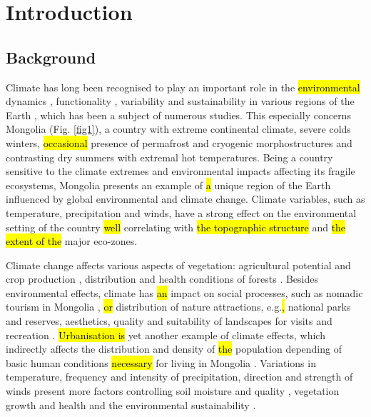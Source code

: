 \documentclass[geosciences,article,submit,pdftex,moreauthors]{Definitions/mdpi}
\begin{document}
\section{Introduction}

\subsection{Background}
Climate has long been recognised to play an important role in the \hl{environmental} dynamics \cite{Dashkhuu}, functionality \cite{Natsagdorj,An}, variability and sustainability in various regions of the Earth \cite{SATTLER2021101620,Jiang,Lemenkova2021a,DUGERDIL2021107235}, which has been a subject of numerous studies. This especially concerns Mongolia (Fig. \ref{fig1}), a country with extreme continental climate, severe colds winters, \hl{occasional} presence of permafrost and cryogenic morphostructures \cite{Dashtseren2021,Tsedevdorj2021,Blomdin} and contrasting dry summers with extremal hot temperatures. Being a country sensitive to the climate extremes and environmental impacts affecting its fragile ecosystems, Mongolia presents an example of \hl{a} unique region of the Earth influenced by global environmental and climate change. Climate variables, such as temperature, precipitation and winds, have a strong effect on the environmental setting of the country \hl{well} correlating with \hl{the topographic structure} and \hl{the extent of the} major eco-zones. 

Climate change affects various aspects of vegetation: agricultural potential and crop production \cite{Otgonbayar,Lemenkova2021b,Munkhtur}, distribution and health conditions of forests \cite{Erdenebaatar,WANG2022e02034}. Besides environmental effects, climate has \hl{an} impact on social processes, such as nomadic tourism in Mongolia \cite{OGORMAN2007161,BUCKLEY200847}, \hl{or} distribution of nature attractions, e.g.\hl{, }national parks and reserves, aesthetics, quality and suitability of landscapes for visits and recreation \cite{Gantemur,Klauco2017}. \hl{Urbanisation is} yet another example of climate effects, which indirectly affects the distribution and density of \hl{the} population depending of basic human conditions \hl{necessary} for living in Mongolia \cite{Fan,Khishigdorj,Oyunjargal}. Variations in temperature, frequency and intensity of precipitation, direction and strength of winds present more factors controlling soil moisture and quality \cite{Samdandorj}, vegetation growth and health \cite{Kolar,Lemenkova2020a,MENG2022152198} and the environmental sustainability \cite{Guo,Lemenkova2020b}. 
\end{document}
